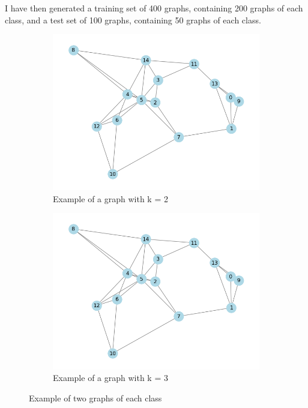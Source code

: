 \documentclass[a4paper,11pt]{article}
\begin{document}
I have then generated a training set of 400 graphs, containing 200 graphs of each class, and a test set of 100 graphs, containing 50 graphs of each class.\\

\begin{figure}[h]
    \centering
    \begin{subfigure}{0.4\textwidth}
        \includegraphics[width=\textwidth]{figures/graph_k3.png}
        \caption{Example of a graph with k = 2 }
    \end{subfigure}
    \begin{subfigure}{0.4\textwidth}
        \includegraphics[width=\textwidth]{figures/graph_k3.png}
        \caption{Example of a graph with k = 3}
    \end{subfigure}
    \caption{Example of two graphs of each class}
\end{figure} 
\end{document}
